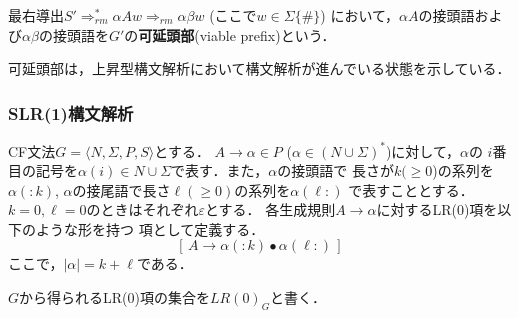 \documentclass[a4j,dvipdfmx]{jbook}
\begin{document}
\begin{Def}
  最右導出$S'\Rightarrow_{rm}^\ast\alpha A w\Rightarrow_{rm}\alpha\beta w$ (ここで$w\in\Sigma\{\texttt{\#}\}$)
  において，$\alpha A$の接頭語および$\alpha\beta$の接頭語を$G'$の{\bf 可延頭部}(viable prefix)という．
\end{Def}

可延頭部は，上昇型構文解析において構文解析が進んでいる状態を示している．
\subsubsection{SLR(1)構文解析}

\begin{Def}
  CF文法$G=\langle N,\Sigma,P,S\rangle$とする．
  $A\rightarrow\alpha\in P$ ($\alpha\in(N\cup\Sigma)^\ast$)に対して，$\alpha$の
  $i$番目の記号を$\alpha(i)\in N\cup\Sigma$で表す．また，$\alpha$の接頭語で
  長さが$k(\geq 0$)の系列を$\alpha(:k)$, $\alpha$の接尾語で長さ$\ell(\geq 0)$の系列を$\alpha(\ell:)$
  で表すこととする．$k=0,\ell=0$のときはそれぞれ$\varepsilon$とする．
  各生成規則$A\rightarrow\alpha$に対するLR(0)項を以下のような形を持つ
  項として定義する．
  \[[\,A\rightarrow\alpha(:k)\bullet\alpha(\ell:)\,]\]
  ここで，$|\alpha|=k+\ell$である．

  $G$から得られるLR(0)項の集合を$LR(0)_G$と書く．
\end{Def}
\end{document}

